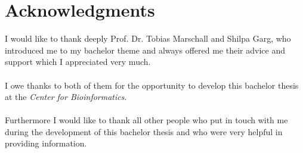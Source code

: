 \section*{Acknowledgments}
I would like to thank deeply Prof. Dr. Tobias Marschall and Shilpa Garg, who introduced me to my bachelor theme and always offered me their advice and support which I appreciated very much.\\
\\
I owe thanks to both of them for the opportunity to develop this bachelor thesis at the \textit{Center for Bioinformatics}.\\
\\
Furthermore I would like to thank all other people who put in touch with me during the development of this bachelor thesis and who were very helpful in providing information.